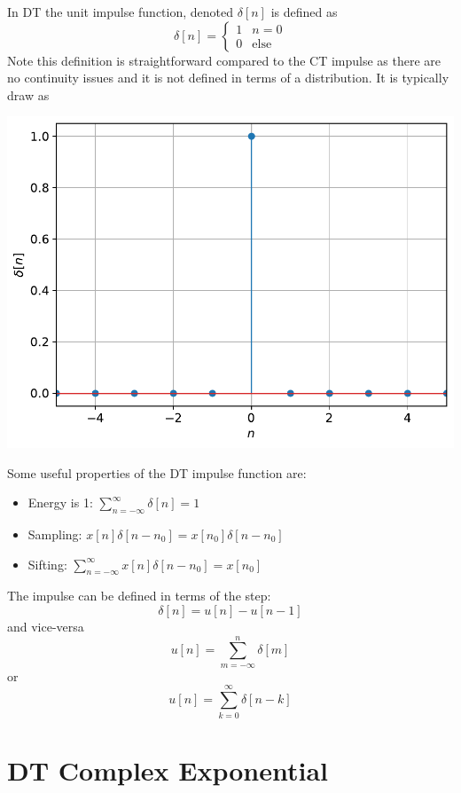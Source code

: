 In DT the unit impulse function, denoted $\delta[n]$ is defined as
\[
\delta[n] = \left\{
\begin{array}{ll}
  1 & n = 0\\
  0 & \text{else}
\end{array}
\right.
\]
Note this definition is straightforward compared to the CT impulse as there are no continuity issues and it is not defined in terms of a distribution. It is typically draw as
\begin{center}
  \includegraphics[scale=0.5]{graphics/dtdelta.pdf}
\end{center}

Some useful properties of the DT impulse function are:

\begin{itemize}
\item Energy is 1: $\sum\limits_{n=-\infty}^{\infty} \delta[n] = 1$
\item Sampling: $x[n]\delta[n-n_0] = x[n_0]\delta[n-n_0]$
\item Sifting: $\sum\limits_{n=-\infty}^{\infty} x[n]\delta[n-n_0] = x[n_0]$
\end{itemize}

The impulse can be defined in terms of the step:
\[
\delta[n] = u[n] - u[n-1]
\]
and vice-versa
\[
u[n] = \sum\limits_{m=-\infty}^{n} \delta[m]
\]
or
\[
u[n] = \sum\limits_{k=0}^{\infty} \delta[n-k]
\]

\section{DT Complex Exponential}

